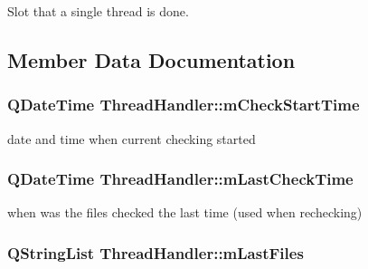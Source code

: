 Slot that a single thread is done. 



\subsection{Member Data Documentation}
\hypertarget{class_thread_handler_a7a45b4a20d7951ce48f53df68cca5e39}{
\subsubsection[{m\-Check\-Start\-Time}]{\setlength{\rightskip}{0pt plus 5cm}Q\-Date\-Time Thread\-Handler\-::m\-Check\-Start\-Time\hspace{0.3cm}{\ttfamily [protected]}}}\label{class_thread_handler_a7a45b4a20d7951ce48f53df68cca5e39}


date and time when current checking started 

\hypertarget{class_thread_handler_a8e77afe57fcae1e5158a8c84dbe930c4}{
\subsubsection[{m\-Last\-Check\-Time}]{\setlength{\rightskip}{0pt plus 5cm}Q\-Date\-Time Thread\-Handler\-::m\-Last\-Check\-Time\hspace{0.3cm}{\ttfamily [protected]}}}\label{class_thread_handler_a8e77afe57fcae1e5158a8c84dbe930c4}


when was the files checked the last time (used when rechecking) 

\hypertarget{class_thread_handler_a54dffd1608f635d8d02066d7960e0fbe}{
\subsubsection[{m\-Last\-Files}]{\setlength{\rightskip}{0pt plus 5cm}Q\-String\-List Thread\-Handler\-::m\-Last\-Files\hspace{0.3cm}{\ttfamily [protected]}}}\label{class_thread_handler_a54dffd1608f635d8d02066d7960e0fbe}


